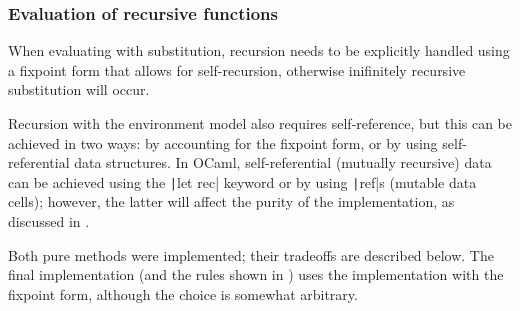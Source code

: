 \subsubsection{Evaluation of recursive functions}
\label{sec:rec_impl}

When evaluating with substitution, recursion needs to be explicitly handled using a fixpoint form that allows for self-recursion, otherwise inifinitely recursive substitution will occur.

Recursion with the environment model also requires self-reference, but this can be achieved in two ways: by accounting for the fixpoint form, or by using self-referential data structures. In OCaml, self-referential (mutually recursive) data can be achieved using the \texttt|let rec| keyword or by using \texttt|ref|s (mutable data cells); however, the latter will affect the purity of the implementation, as discussed in .

Both pure methods were implemented; their tradeoffs are described below. The final implementation (and the rules shown in ) uses the implementation with the fixpoint form, although the choice is somewhat arbitrary.

